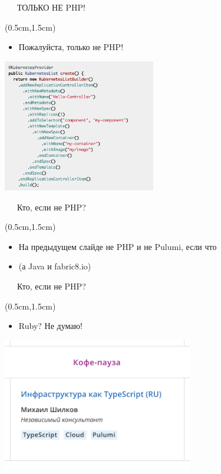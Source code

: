 \documentclass[xetex,18pt,aspectratio=43]{beamer}
\begin{document}
\begin{Large}
\begin{frame}{\ \ \ ТОЛЬКО НЕ PHP!}
\begin{textblock*}{\framewidth-0.8cm}(0.5cm,1.5cm)
\begin{itemize}
\item Пожалуйста, только не PHP!
\end{itemize}
\begin{minipage}{\textwidth}
  \centering
  \includegraphics[height=5.8cm]{img/javamadness}
\end{minipage}
\end{textblock*}
\end{frame}

\begin{frame}{\ \ \ Кто, если не PHP?}
\begin{textblock*}{\framewidth-0.8cm}(0.5cm,1.5cm)
\begin{itemize}
  \item На предыдущем слайде не PHP и не Pulumi, если что
  \item (а Java и fabric8.io)
\end{itemize}
\end{textblock*}
\end{frame}

\begin{frame}{\ \ \ Кто, если не PHP?}
\begin{textblock*}{\framewidth-0.8cm}(0.5cm,1.5cm)
\begin{itemize}
  \item Ruby? Не думаю!
\end{itemize}
\begin{minipage}{\textwidth}
  \centering
  \includegraphics[height=5.8cm]{img/typescript}
\end{minipage}
\end{textblock*}
\end{frame}


\end{Large}
\end{document}
